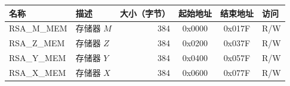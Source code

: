 \begin{longtable}{ | p{3.0cm} | l | r | c | c | l | }
\hline\rowcolor{lightgray}\label{tab:rsa-mem}
\textbf{名称} & \textbf{描述}  &  \textbf{大小（字节）}  &  \textbf{起始地址}  &  \textbf{结束地址}  & \textbf{访问}   \\ \hline
RSA\_M\_MEM & 存储器 \begin{math}M\end{math}  & 384  & 0x0000 & 0x017F & R/W \\ \hline
RSA\_Z\_MEM & 存储器 \begin{math}Z\end{math}  & 384  & 0x0200 & 0x037F & R/W \\ \hline
RSA\_Y\_MEM & 存储器 \begin{math}Y\end{math}  & 384  & 0x0400 & 0x057F & R/W \\ \hline
RSA\_X\_MEM & 存储器 \begin{math}X\end{math}  & 384  & 0x0600 & 0x077F & R/W \\ \hline
\end{longtable}
